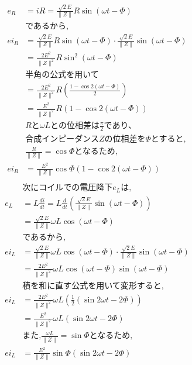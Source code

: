 \documentclass[twocolumn]{article}
\begin{document}
\begin{enumerate}
\begin{align*}
          e_R &= iR = \frac{\sqrt{2}E}{\|Z\|} R \sin \left( \omega t - \Phi\right)\\
          &\text{であるから,}\\
          ei_R&= \frac{\sqrt{2}E}{\|Z\|} R \sin \left( \omega t - \Phi\right) \cdot \frac{\sqrt{2}E}{\|Z\|} \sin \left( \omega t - \Phi\right)\\
              &= \frac{2E^2}{\|Z\|^2} R \sin^2 \left(\omega t - \Phi\right)\\
          &\text{半角の公式を用いて}\\
          &= \frac{2E^2}{\|Z\|^2} R \left( \frac{1-\cos2\left(\omega t - \Phi\right)}{2} \right)\\
          &= \frac{E^2}{\|Z\|^2} R \left( 1-\cos2\left(\omega t - \Phi\right)\right)\\
          &R\text{と}\omega L \text{との位相差は} \frac{\pi}{2} \text{であり、}\\
          &\text{合成インピーダンス}Z\text{の位相差を}\Phi \text{とすると,}\\
          &\frac{R}{\|Z\|} = \cos \Phi \text{となるため,}\\
          ei_R&= \frac{E^2}{\|Z\|} \cos \Phi \left( 1-\cos2\left(\omega t - \Phi\right)\right)\\
        \end{align*}
        \begin{align*} 
          &\text{次にコイルでの電圧降下}e_L \text{は,}\\
          e_L &= L \frac{di}{dt} = L \frac{d}{dt} \left( \frac{\sqrt{2}E}{\|Z\|} \sin \left( \omega t - \Phi\right) \right)\\
              &= \frac{\sqrt{2}E}{\|Z\|} \omega L \cos \left(\omega t - \Phi\right)\\
          &\text{であるから,}\\
          ei_L&= \frac{\sqrt{2}E}{\|Z\|}\omega L \cos\left(\omega t - \Phi\right) \cdot \frac{\sqrt{2}E}{\|Z\|} \sin \left( \omega t - \Phi\right)\\
              &= \frac{2E^2}{\|Z\|^2} \omega L \cos\left(\omega t - \Phi\right)\sin\left(\omega t - \Phi\right)\\
          &\text{積を和に直す公式を用いて変形すると,}\\
          ei_L&= \frac{2E^2}{\|Z\|^2}\omega L \left(\frac{1}{2} \left(\sin 2\omega t - 2\Phi\right)\right) \\
              &= \frac{E^2}{\|Z\|^2}\omega L \left(\sin 2\omega t - 2\Phi\right)\\
          &\text{また,} \frac{\omega L}{\|Z\|} = \sin \Phi \text{となるため,}\\
          ei_L&= \frac{E^2}{\|Z\|}\sin \Phi \left(\sin 2\omega t - 2\Phi\right)\\
            \end{align*}
  
\end{enumerate}
\end{document}
